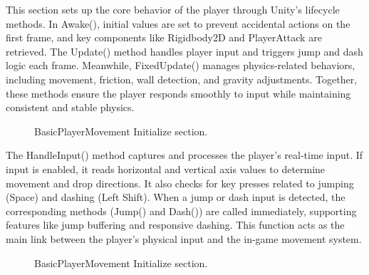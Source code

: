 \documentclass[12pt,oneside,openright,a4paper]{cpe-english-project}
\begin{document}
\newpage
This section sets up the core behavior of the player through Unity’s lifecycle methods. In Awake(), initial values are set to prevent accidental actions on the first frame, and key components like Rigidbody2D and PlayerAttack are retrieved. The Update() method handles player input and triggers jump and dash logic each frame. Meanwhile, FixedUpdate() manages physics-related behaviors, including movement, friction, wall detection, and gravity adjustments. Together, these methods ensure the player responds smoothly to input while maintaining consistent and stable physics.\par
 \begin{figure}[!h]
 \centering
\caption{BasicPlayerMovement Initialize section.}\label{fig:AUF}
\end{figure}
The HandleInput() method captures and processes the player's real-time input. If input is enabled, it reads horizontal and vertical axis values to determine movement and drop directions. It also checks for key presses related to jumping (Space) and dashing (Left Shift). When a jump or dash input is detected, the corresponding methods (Jump() and Dash()) are called immediately, supporting features like jump buffering and responsive dashing. This function acts as the main link between the player’s physical input and the in-game movement system.\par
 \begin{figure}[!h]
 \centering
\caption{BasicPlayerMovement Initialize section.}\label{fig:Input}
\end{figure}
\end{document}
